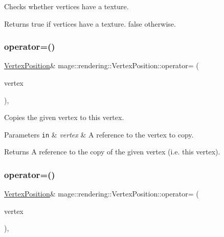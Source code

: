 Checks whether vertices have a texture.

\begin{DoxyReturn}{Returns}
{\ttfamily true} if vertices have a texture. {\ttfamily false} otherwise. 
\end{DoxyReturn}
\mbox{\label{structmage_1_1rendering_1_1_vertex_position_ae33b66ce10c878f9f38867ccdcebdadd}} 
\subsubsection{\texorpdfstring{operator=()}{operator=()}\hspace{0.1cm}{\footnotesize\ttfamily [1/2]}}
{\footnotesize\ttfamily \mbox{\hyperlink{structmage_1_1rendering_1_1_vertex_position}{Vertex\+Position}}\& mage\+::rendering\+::\+Vertex\+Position\+::operator= (\begin{DoxyParamCaption}\item[{const \mbox{\hyperlink{structmage_1_1rendering_1_1_vertex_position}{Vertex\+Position}} \&}]{vertex }\end{DoxyParamCaption})\hspace{0.3cm}{\ttfamily [default]}, {\ttfamily [noexcept]}}

Copies the given vertex to this vertex.


\begin{DoxyParams}[1]{Parameters}
\mbox{\tt in}  & {\em vertex} & A reference to the vertex to copy. \\
\hline
\end{DoxyParams}
\begin{DoxyReturn}{Returns}
A reference to the copy of the given vertex (i.\+e. this vertex). 
\end{DoxyReturn}
\mbox{\label{structmage_1_1rendering_1_1_vertex_position_ad6ea7633290d8f1bd38969f78145237f}} 
\subsubsection{\texorpdfstring{operator=()}{operator=()}\hspace{0.1cm}{\footnotesize\ttfamily [2/2]}}
{\footnotesize\ttfamily \mbox{\hyperlink{structmage_1_1rendering_1_1_vertex_position}{Vertex\+Position}}\& mage\+::rendering\+::\+Vertex\+Position\+::operator= (\begin{DoxyParamCaption}\item[{\mbox{\hyperlink{structmage_1_1rendering_1_1_vertex_position}{Vertex\+Position}} \&\&}]{vertex }\end{DoxyParamCaption})\hspace{0.3cm}{\ttfamily [default]}, {\ttfamily [noexcept]}}

